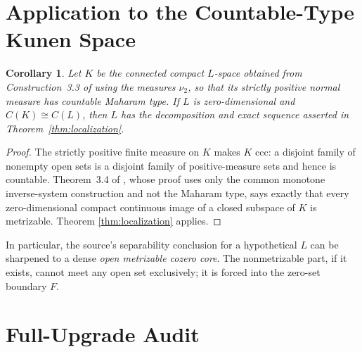 \documentclass[11pt]{article}
\newtheorem{corollary}{Corollary}
\begin{document}
\section*{Application to the Countable-Type Kunen Space}

\begin{corollary}\label{cor:kunen}
Let $K$ be the connected compact $L$-space obtained from
Construction~3.3 of \cite{PlebanekKunen} using the measures $\nu_2$, so
that its strictly positive normal measure has countable Maharam type.  If
$L$ is zero-dimensional and $C(K)\cong C(L)$, then $L$ has the
decomposition and exact sequence asserted in
Theorem~\ref{thm:localization}.
\end{corollary}

\begin{proof}
The strictly positive finite measure on $K$ makes $K$ ccc: a disjoint
family of nonempty open sets is a disjoint family of positive-measure sets
and hence is countable.  Theorem~3.4 of \cite{PlebanekKunen}, whose proof
uses only the common monotone inverse-system construction and not the
Maharam type, says exactly that every zero-dimensional compact continuous
image of a closed subspace of $K$ is metrizable.  Theorem
\ref{thm:localization} applies.
\end{proof}

In particular, the source's separability conclusion for a hypothetical
$L$ can be sharpened to a dense \emph{open metrizable cozero core}.  The
nonmetrizable part, if it exists, cannot meet any open set exclusively; it
is forced into the zero-set boundary $F$.

\section*{Full-Upgrade Audit}
\end{document}
